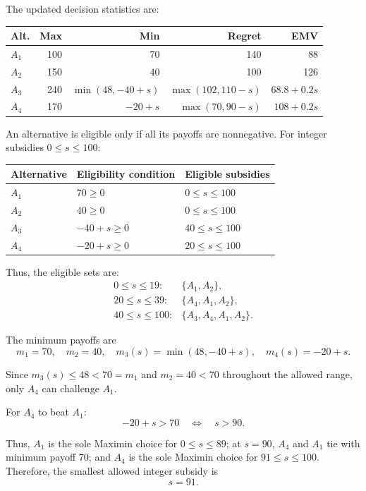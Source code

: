 The updated decision statistics are:

\begin{center}\small\setlength{\tabcolsep}{4pt}
	\begin{tabular}{lrrrr}\toprule
		Alt. & Max & Min & Regret & EMV\\ \midrule
		$A_1$ & 100 & 70 & 140 & 88\\
		$A_2$ & 150 & 40 & 100 & 126\\
		$A_3$ & 240 & $\min(48,-40+s)$ & $\max(102,110-s)$ & $68.8+0.2s$\\
		$A_4$ & 170 & $-20+s$ & $\max(70,90-s)$ & $108+0.2s$\\
		\bottomrule
	\end{tabular}
\end{center}

An alternative is eligible only if all its payoffs are nonnegative.
For integer subsidies $0\le s\le100$:

\begin{center}
	\begin{tabular}{lll}\toprule
		Alternative & Eligibility condition & Eligible subsidies\\\midrule
		$A_1$ & $70\ge0$ & $0\le s\le100$\\
		$A_2$ & $40\ge0$ & $0\le s\le100$\\
		$A_3$ & $-40+s\ge0$ & $40\le s\le100$\\
		$A_4$ & $-20+s\ge0$ & $20\le s\le100$\\
		\bottomrule
	\end{tabular}
\end{center}

Thus, the eligible sets are:
\[
\begin{array}{ll}
	0\le s\le19: & \{A_1,A_2\},\\
	20\le s\le39: & \{A_4,A_1,A_2\},\\
	40\le s\le100: & \{A_3,A_4,A_1,A_2\}.
\end{array}
\]

The minimum payoffs are
\[
m_1=70,\quad m_2=40,\quad
m_3(s)=\min(48,-40+s),\quad m_4(s)=-20+s.
\]

Since $m_3(s)\le48<70=m_1$ and $m_2=40<70$ throughout
the allowed range, only $A_4$ can challenge $A_1$.

For $A_4$ to beat $A_1$:
\[
-20+s>70
\quad\Longleftrightarrow\quad s>90.
\]

Thus, $A_1$ is the sole Maximin choice for $0\le s\le89$;
at $s=90$, $A_4$ and $A_1$ tie with minimum payoff 70;
and $A_4$ is the sole Maximin choice for $91\le s\le100$.
Therefore, the smallest allowed integer subsidy is
\[
\boxed{s=91}.
\]

